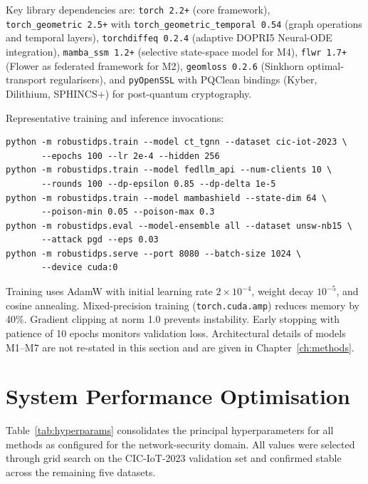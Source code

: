 Key library dependencies are: \texttt{torch~2.2+} (core framework), \texttt{torch\_geometric~2.5+} with \texttt{torch\_geometric\_temporal~0.54} (graph operations and temporal layers), \texttt{torchdiffeq~0.2.4} (adaptive DOPRI5 Neural-ODE integration), \texttt{mamba\_ssm~1.2+} (selective state-space model for M4), \texttt{flwr~1.7+} (Flower as federated framework for M2), \texttt{geomloss~0.2.6} (Sinkhorn optimal-transport regularisers), and \texttt{pyOpenSSL} with PQClean bindings (Kyber, Dilithium, SPHINCS+) for post-quantum cryptography.

Representative training and inference invocations:
\begin{verbatim}
python -m robustidps.train --model ct_tgnn --dataset cic-iot-2023 \
       --epochs 100 --lr 2e-4 --hidden 256
python -m robustidps.train --model fedllm_api --num-clients 10 \
       --rounds 100 --dp-epsilon 0.85 --dp-delta 1e-5
python -m robustidps.train --model mambashield --state-dim 64 \
       --poison-min 0.05 --poison-max 0.3
python -m robustidps.eval --model-ensemble all --dataset unsw-nb15 \
       --attack pgd --eps 0.03
python -m robustidps.serve --port 8080 --batch-size 1024 \
       --device cuda:0
\end{verbatim}

Training uses AdamW with initial learning rate $2\times10^{-4}$, weight decay $10^{-5}$, and cosine annealing. Mixed-precision training (\texttt{torch.cuda.amp}) reduces memory by 40\%. Gradient clipping at norm 1.0 prevents instability. Early stopping with patience of 10 epochs monitors validation loss. Architectural details of models M1--M7 are not re-stated in this section and are given in Chapter~\ref{ch:methods}.

\section{System Performance Optimisation}
\label{sec:hyperparams}

Table~\ref{tab:hyperparams} consolidates the principal hyperparameters for all methods as configured for the network-security domain. All values were selected through grid search on the CIC-IoT-2023 validation set and confirmed stable across the remaining five datasets.


